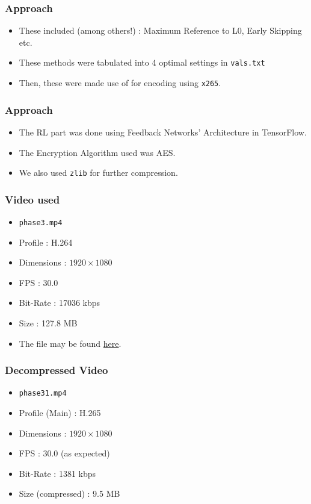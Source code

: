 \documentclass{beamer}
\begin{document}
\begin{frame}
    \frametitle{Approach}
    \begin{itemize}
        \item These included (among others!) :  Maximum Reference to L0, Early Skipping etc.
        \pause
        \item These methods were tabulated into 4 optimal settings in \texttt{vals.txt}
        \pause
        \item Then, these were made use of for encoding using \texttt{x265}.
    \end{itemize}
\end{frame}



\begin{frame}
    \frametitle{Approach}
    \begin{itemize}
        \item The RL part was done using Feedback Networks' Architecture in TensorFlow.
        \pause
        \item The Encryption Algorithm used was AES.
        \pause
        \item We also used \texttt{zlib} for further compression.
    \end{itemize}
\end{frame}


\begin{frame}
    \frametitle{Video used}
    \begin{itemize}
        \item \texttt{phase3.mp4}
        \item Profile : H.264
        \item Dimensions : $1920 \times 1080$
        \item FPS : 30.0
        \item Bit-Rate : 17036 kbps
        \item Size : 127.8 MB
        \item The file may be found \href{https://drive.google.com/file/d/14fxNcPJBfU-HgPigVKemZpu6zYA3YGQZ/view?usp=sharing}{here}.
    \end{itemize}
\end{frame}

\begin{frame}
    \frametitle{Decompressed Video}
    \begin{itemize}
        \item \texttt{phase31.mp4}
        \item Profile (Main) : H.265
        \item Dimensions : $1920 \times 1080$
        \item FPS : 30.0 (as expected)
        \item Bit-Rate : 1381 kbps
        \item Size (compressed) : 9.5 MB
    \end{itemize}

\end{frame}
\end{document}
